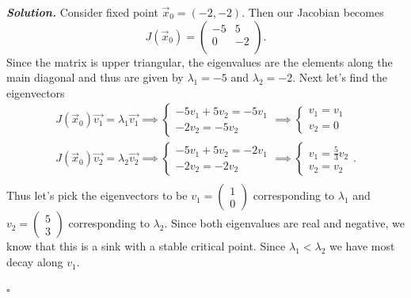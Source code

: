 \documentclass[12pt]{report}
\newenvironment{solution}[1][\it{Solution}]{\textbf{#1. } }{$\square$}
\begin{document}
\begin{solution}
    \noindent 
    Consider fixed point $\vec{x}_0 = (-2,-2)$. Then our Jacobian becomes
    \[ J(\vec{x}_0) = \left(
        \begin{array}{cc}
         -5 & 5 \\
         0 & -2 \\
        \end{array}
        \right).
    \]
    Since the matrix is upper triangular, the eigenvalues are the elements along the main diagonal and thus are given by $\lambda_1 = -5$ and $\lambda_2 = -2$. Next let's find the eigenvectors
    \begin{align*}
        J(\vec{x}_0)\vec{v_1} = \lambda_1 \vec{v_1} \implies \begin{cases}
            -5v_1 + 5v_2 = -5v_1\\
            -2v_2 = -5v_2
        \end{cases} \implies
        \begin{cases}
            v_1 = v_1\\
            v_2 = 0
        \end{cases}\\
        J(\vec{x}_0)\vec{v_2} = \lambda_2 \vec{v_2} \implies \begin{cases}
            -5v_1 + 5v_2 = -2v_1\\
            -2v_2 = -2v_2
        \end{cases} \implies
        \begin{cases}
            v_1 = \frac{5}{3}v_2\\
            v_2 = v_2
        \end{cases}.\\
    \end{align*}
    Thus let's pick the eigenvectors to be $v_1 = \begin{pmatrix}
        1\\0
    \end{pmatrix}$ corresponding to $\lambda_1$ and $v_2 = \begin{pmatrix}
        5\\3
    \end{pmatrix}$ corresponding to $\lambda_2$. Since both eigenvalues are real and negative, we know that this is a sink with a stable critical point. Since $\lambda_1 < \lambda_2$ we have most decay along $v_1$.


\end{solution}
\end{document}

